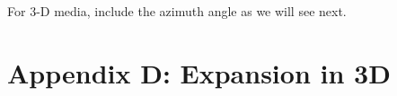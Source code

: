 \begin{comment}
the following:
\beqa
\tau(x,z)=\sqrt{\frac{x^2}{v^2}+\frac{z^2}{v_t^2}} \left( \frac{ 2
   \left(v^{2}-v_t^{2}\right) z \sin ^3\theta \left(v_t^{2} x^4-v^{2} z^4\right) \left(v^2 z^2+v_t^2
   x^2\right) \left(\left(3 v^2+v_t^2\right) x^2+4 v^2 z^2\right)}{2 \left(v^2 z^2+v_t^2 x^2\right){}^2
   \left(2 v^4 z^3 \left(3 x^2 \sin\theta+x z+4 z^2 \sin (\theta
   )\right)+2 v_t^2 v^2 x^2 z \left(3 x^2 \sin\theta+6 x z \eta +2 x
   z+5 z^2 \sin\theta\right)+v_t^4 x^4 (x (3 \eta +2)+2 z \sin
  \theta)\right)} + \right. \nonumber \\ \frac{2 x
   \left(v^2 z^2+v_t^2 x^2\right){}^2 \left(2 v^4 z^4+4 v^2 v_t^2 x^2
   z^2 (3 \eta +1)+v_t^4 x^4 (\eta +2)\right)}{2 \left(v^2 z^2+v_t^2 x^2\right){}^2
   \left(2 v^4 z^3 \left(3 x^2 \sin\theta+x z+4 z^2 \sin (\theta
   )\right)+2 v_t^2 v^2 x^2 z \left(3 x^2 \sin\theta+6 x z \eta +2 x
   z+5 z^2 \sin\theta\right)+v_t^4 x^4 (x (3 \eta +2)+2 z \sin
  \theta)\right)} + \nonumber \\  \left.
      \frac{x \sin ^2\theta
   \left(18 v^6 \left(v_t^2-v^2\right) z^8-4 v_t^4 x^6 z^2 \left(v^4 (6
   \eta +2)+v_t^2 v^2 (9 \eta -1)+v_t^4 (\eta -1)\right)-v^2 v_t^2 x^4
   z^4 \left(22 v^4+v_t^2 v^2 (99 \eta +4)+v_t^4 (29 \eta -26)\right)-4
   v^4 x^2 z^6 \left(3 v^4+v_t^2 v^2 (3 \eta +7)+v_t^4 (13 \eta
   -10)\right)+\left(v-v_t\right) v_t^6 \left(v+v_t\right) x^8 (3 \eta
   +2)\right)+2 z \sin\theta \left(8 v^8 z^8+v_t^6 x^8 \left(v^2
   (4-15 \eta )-v_t^2 (\eta -4)\right)+v^2 v_t^4 x^6 z^2 \left(3 v^2
   (4-9 \eta )-5 v_t^2 (\eta -4)\right)+4 v^6 \left(v^2+7 v_t^2\right)
   x^2 z^6-4 v^4 v_t^2 x^4 z^4 \left(3 v^2 (\eta -1)+v_t^2 (\eta
   -9)\right)\right)}{2 \left(v^2 z^2+v_t^2 x^2\right){}^2
   \left(2 v^4 z^3 \left(3 x^2 \sin\theta+x z+4 z^2 \sin (\theta
   )\right)+2 v_t^2 v^2 x^2 z \left(3 x^2 \sin\theta+6 x z \eta +2 x
   z+5 z^2 \sin\theta\right)+v_t^4 x^4 (x (3 \eta +2)+2 z \sin
  \theta)\right)}  \right).
\label{eqn:homo5}
\eeqa
\end{comment}

For 3-D media,   include the azimuth angle as we will see next.


\appendix
\section{Appendix D: Expansion in 3D}

